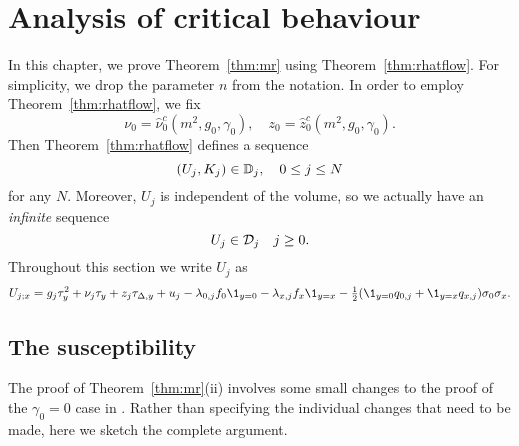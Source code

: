 \chapter{Analysis of critical behaviour}
\label{sec:chi-G-xi}

In this chapter, we prove Theorem~\ref{thm:mr} using Theorem~\ref{thm:rhatflow}.
For simplicity, we drop the parameter $n$ from the notation. In order to employ
Theorem~\ref{thm:rhatflow}, we fix
\begin{equation}
\nu_0 = \hat\nu_0^c(m^2, g_0, \gamma_0),
	\quad
z_0 = \hat z_0^c(m^2, g_0, \gamma_0).
\end{equation}
Then Theorem~\ref{thm:rhatflow} defines a sequence
\begin{equation}
(U_j, K_j) \in \mathbb{D}_j,
	\quad
0 \le j \le N
\end{equation}
for any $N$. Moreover, $U_j$ is independent of the volume, so we actually have
an \emph{infinite} sequence
\begin{equation}
U_j \in \mathcal{D}_j
	\quad
j \ge 0.
\end{equation}
Throughout this section we write $U_j$ as
\begin{equation}
U_{j;x}
	=
g_j \tau_y^2 + \nu_j \tau_y + z_j \tau_{\Delta,y} + u_j
- \lambda_{0,j} f_0 \1_{y=0}
- \lambda_{x,j} f_x \1_{y=x}
- \tfrac12 (\1_{y=0} q_{0,j} + \1_{y=x} q_{x,j}) \sigma_0 \sigma_x.
\end{equation}



\section{The susceptibility}
\label{sec:suscept}

The proof of Theorem~\ref{thm:mr}(ii) involves some small changes to the proof
of the $\gamma_0 = 0$ case in \cite{BBS-saw4-log}. Rather than specifying the
individual changes that need to be made, here we sketch the complete argument.

